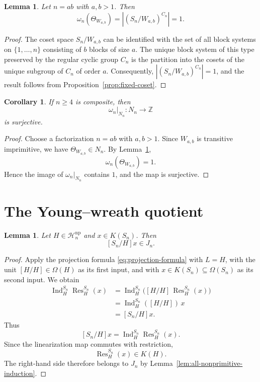 \documentclass[a4paper,11pt]{article}
\numberwithin{equation}{section}
\newtheorem{lemma}[theorem]{Lemma}
\newtheorem{corollary}[theorem]{Corollary}
\newcommand{\Z}{\mathbb{Z}}
\newcommand{\Ind}{\operatorname{Ind}}
\newcommand{\Res}{\operatorname{Res}}
\begin{document}
\begin{lemma}\label{lem:wreath-one}
Let $n=ab$ with $a,b>1$. Then
\[
  \omega_n(\Theta_{W_{a,b}})
  =
  |(S_n/W_{a,b})^{C_n}|
  =
  1.
\]
\end{lemma}

\begin{proof}
The coset space $S_n/W_{a,b}$ can be identified with the set of all block
systems on $\{1,\ldots,n\}$ consisting of $b$ blocks of size $a$. The unique
block system of this type preserved by the regular cyclic group $C_n$ is the
partition into the cosets of the unique subgroup of $C_n$ of order $a$.
Consequently, $|(S_n/W_{a,b})^{C_n}|=1$, and the result follows from
Proposition~\ref{prop:fixed-coset}.
\end{proof}

\begin{corollary}\label{cor:surjective}
If $n\ge4$ is composite, then
\[
  \omega_n|_{N_n}:N_n\longrightarrow\Z
\]
is surjective.
\end{corollary}

\begin{proof}
Choose a factorization $n=ab$ with $a,b>1$. Since $W_{a,b}$ is transitive
imprimitive, we have $\Theta_{W_{a,b}}\in N_n$. By
Lemma~\ref{lem:wreath-one},
\[
  \omega_n(\Theta_{W_{a,b}})=1.
\]
Hence the image of $\omega_n|_{N_n}$ contains $1$, and the map is surjective.
\end{proof}

\section{The Young--wreath quotient}\label{sec:main-result}

\begin{lemma}\label{lem:projection}
Let $H\in\mathcal H_n^{\mathrm{np}}$ and $x\in K(S_n)$. Then
\[
  [S_n/H]x\in J_n.
\]
\end{lemma}

\begin{proof}
Apply the projection formula \eqref{eq:projection-formula} with $L=H$, with the
unit $[H/H]\in\Omega(H)$ as its first input, and with
$x\in K(S_n)\subseteq\Omega(S_n)$ as its second input. We obtain
\[
\begin{aligned}
  \Ind_H^{S_n}\Res_H^{S_n}(x)
  &=
  \Ind_H^{S_n}\bigl([H/H]\,\Res_H^{S_n}(x)\bigr)\\
  &=
  \Ind_H^{S_n}([H/H])\,x\\
  &=
  [S_n/H]x.
\end{aligned}
\]
Thus
\[
  [S_n/H]x
  =
  \Ind_H^{S_n}\Res_H^{S_n}(x).
\]
Since the linearization map commutes with restriction,
\[
  \Res_H^{S_n}(x)\in K(H).
\]
The right-hand side therefore belongs to $J_n$ by
Lemma~\ref{lem:all-nonprimitive-induction}.
\end{proof}
\end{document}
